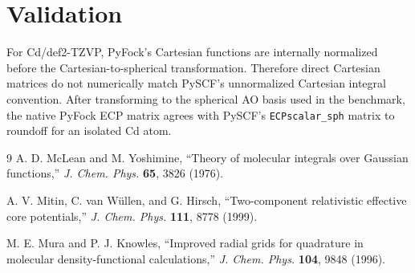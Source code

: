 \documentclass[11pt]{article}
\begin{document}
\section{Validation}

For Cd/def2-TZVP, PyFock's Cartesian functions are internally normalized before
the Cartesian-to-spherical transformation. Therefore direct Cartesian matrices
do not numerically match PySCF's unnormalized Cartesian integral convention.
After transforming to the spherical AO basis used in the benchmark, the native
PyFock ECP matrix agrees with PySCF's \texttt{ECPscalar\_sph} matrix to
roundoff for an isolated Cd atom.

\begin{thebibliography}{9}
A. D. McLean and M. Yoshimine, ``Theory of molecular integrals over Gaussian
functions,'' \emph{J. Chem. Phys.} \textbf{65}, 3826 (1976).

A. V. Mitin, C. van Wüllen, and G. Hirsch, ``Two-component relativistic
effective core potentials,'' \emph{J. Chem. Phys.} \textbf{111}, 8778 (1999).

M. E. Mura and P. J. Knowles, ``Improved radial grids for quadrature in
molecular density-functional calculations,'' \emph{J. Chem. Phys.}
\textbf{104}, 9848 (1996).
\end{thebibliography}
\end{document}
